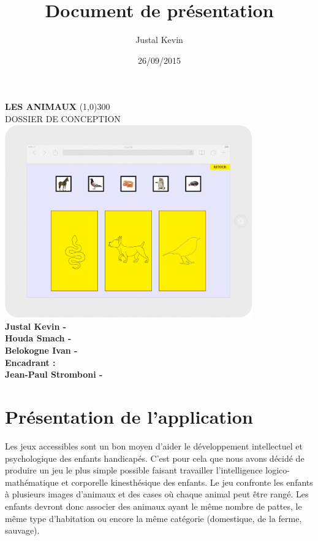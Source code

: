 \documentclass{article}
\title{Document de pr\'esentation}
\author{Justal Kevin}
\date{26/09/2015}
\begin{document}
\begin{center}
\textbf{\Huge{LES ANIMAUX}}
\line(1,0){300}\\
DOSSIER DE CONCEPTION\\
\vspace{3cm}
\includegraphics[width=0.8\textwidth]{tablette}\\
\vspace{3cm}
\textbf{Justal Kevin -  \color{black}{- SI5 - IHM}}\\
\textbf{Houda Smach -  \color{black}{- SSTIM }}\\
\textbf{Belokogne Ivan -  \color{black}{- SSTIM }}\\
\vspace{4cm}
\textbf{Encadrant :}\\
\textbf{Jean-Paul Stromboni - }
\end{center}

\newpage
\tableofcontents

\newpage

\section{Pr\'esentation de l'application}
\hspace*{0.6cm}Les jeux accessibles sont un bon moyen d'aider le d\'eveloppement intellectuel et psychologique des enfants handicap\'es. C'est pour cela que nous avons d\'ecid\'e de produire un jeu le plus simple possible faisant travailler l'intelligence logico-math\'ematique et corporelle kinesth\'esique des enfants. Le jeu confronte les enfants \`a plusieurs images d'animaux et des cases o\`u chaque animal peut \^etre rang\'e. Les enfants devront donc associer des animaux ayant le m\^eme nombre de pattes, le m\^eme type d'habitation ou encore la m\^eme cat\'egorie (domestique, de la ferme, sauvage).
\end{document}
